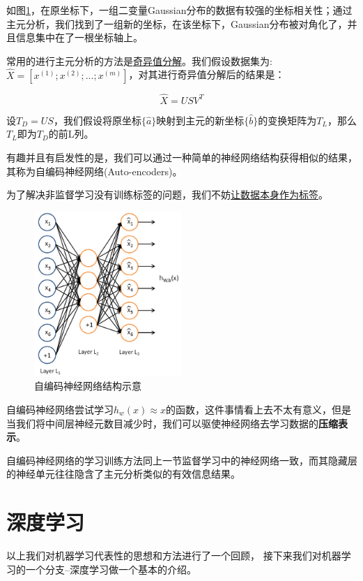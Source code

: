 如图\ref{fig:pca}，在原坐标下，一组二变量Gaussian分布的数据有较强的坐标相关性；通过主元分析，我们找到了一组新的坐标，在该坐标下，Gaussian分布被对角化了，并且信息集中在了一根坐标轴上。

常用的进行主元分析的方法是\uline{奇异值分解}。我们假设数据集为:$\hat{X} = [x^{(1)}; x^{(2)};...; x^{(m)}]$，对其进行奇异值分解后的结果是：

$$\hat{X} = USV^T$$

设$T_D = US$，我们假设将原坐标$\{\hat{a}\}$映射到主元的新坐标$\{\hat{b}\}$的变换矩阵为$T_L$，那么$T_L$即为$T_D$的前L列。

有趣并且有启发性的是，我们可以通过一种简单的神经网络结构获得相似的结果，其称为自编码神经网络(Auto-encoders)。

为了解决非监督学习没有训练标签的问题，我们不妨\uline{让数据本身作为标签}。

\begin{figure}[htbp]
   \centering
   \includegraphics[width=0.5\textwidth]{Autoencoder.png} %
   \caption{自编码神经网络结构示意}
   \label{fig:pca}
\end{figure}

自编码神经网络尝试学习$h_w(x)\approx x$的函数，这件事情看上去不太有意义，但是当我们将中间层神经元数目减少时，我们可以驱使神经网络去学习数据的\textbf{压缩表示}。 

自编码神经网络的学习训练方法同上一节监督学习中的神经网络一致，而其隐藏层的神经单元往往隐含了主元分析类似的有效信息结果。

\section{深度学习}
以上我们对机器学习代表性的思想和方法进行了一个回顾， 接下来我们对机器学习的一个分支--深度学习做一个基本的介绍。

